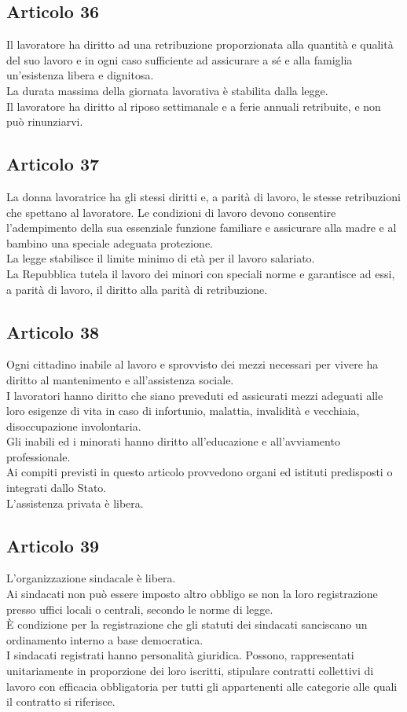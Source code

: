 \documentclass{article}
\newcommand{\articolo}[1]{
	\subsection*{Articolo #1}
}
\begin{document}
\articolo{36}
Il lavoratore ha diritto ad una retribuzione proporzionata alla quantità e qualità del suo lavoro e in ogni caso sufficiente ad assicurare a sé e alla famiglia un’esistenza libera e dignitosa.\\
La durata massima della giornata lavorativa è stabilita dalla legge.\\
Il lavoratore ha diritto al riposo settimanale e a ferie annuali retribuite, e non può rinunziarvi.

\articolo{37}
La donna lavoratrice ha gli stessi diritti e, a parità di lavoro, le stesse retribuzioni che spettano al lavoratore. Le condizioni di lavoro devono consentire l’adempimento della sua essenziale funzione familiare e assicurare alla madre e al bambino una speciale adeguata protezione.\\
La legge stabilisce il limite minimo di età per il lavoro salariato.\\
La Repubblica tutela il lavoro dei minori con speciali norme e garantisce ad essi, a parità di lavoro, il diritto alla parità di retribuzione.

\articolo{38}
Ogni cittadino inabile al lavoro e sprovvisto dei mezzi necessari per vivere ha diritto al mantenimento e all’assistenza sociale.\\
I lavoratori hanno diritto che siano preveduti ed assicurati mezzi adeguati alle loro esigenze di vita in caso di infortunio, malattia, invalidità e vecchiaia, disoccupazione involontaria.\\
Gli inabili ed i minorati hanno diritto all’educazione e all’avviamento professionale.\\
Ai compiti previsti in questo articolo provvedono organi ed istituti predisposti o integrati dallo Stato.\\
L’assistenza privata è libera.

\articolo{39}
L’organizzazione sindacale è libera.\\
Ai sindacati non può essere imposto altro obbligo se non la loro registrazione presso uffici locali o centrali, secondo le norme di legge.\\
È condizione per la registrazione che gli statuti dei sindacati sanciscano un ordinamento interno a base democratica.\\
I sindacati registrati hanno personalità giuridica. Possono, rappresentati unitariamente in proporzione dei loro iscritti, stipulare contratti collettivi di lavoro con efficacia obbligatoria per tutti gli appartenenti alle categorie alle quali il contratto si riferisce.
\end{document}
